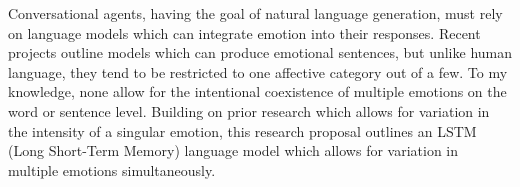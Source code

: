 Conversational agents, having the goal of natural language generation, must rely on language models which can integrate emotion into their responses. Recent projects outline models which can produce emotional sentences, but unlike human language, they tend to be restricted to one affective category out of a few. To my knowledge, none allow for the intentional coexistence of multiple emotions on the word or sentence level. Building on prior research which allows for variation in the intensity of a singular emotion, this research proposal outlines an LSTM (Long Short-Term Memory) language model which allows for variation in multiple emotions simultaneously.

